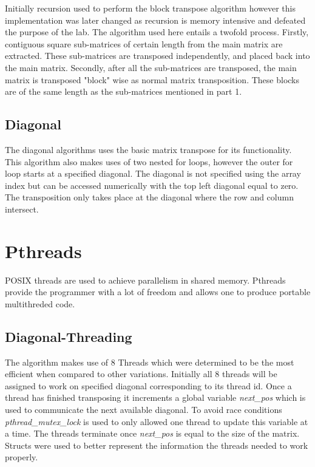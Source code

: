 \documentclass[10pt,journal]{article}
\begin{document}
Initially recursion used to perform the block transpose algorithm however this implementation was later changed as recursion is memory intensive and defeated the purpose of the lab. The algorithm used here entails a twofold process. Firstly, contiguous square sub-matrices of certain length from the main matrix are extracted. These sub-matrices are transposed independently, and placed back into the main matrix. Secondly, after all the sub-matrices are transposed, the main matrix is transposed "block" wise as normal matrix transposition. These blocks are of the same length as the sub-matrices mentioned in part 1. 

\subsection{Diagonal}

The diagonal algorithms uses the basic matrix transpose for its functionality. This algorithm also makes uses of two nested for loops, however the outer for loop starts at a specified diagonal. The diagonal is not specified using the array index but can be accessed numerically with the top left diagonal equal to zero. The transposition only takes place at the diagonal where the row and column intersect. 

\section{Pthreads}

POSIX threads are used to achieve parallelism in shared memory. Pthreads provide the programmer with a lot of freedom and allows one to produce portable multithreded code. 

\subsection{Diagonal-Threading}
The algorithm makes use of 8 Threads which were determined to be the most efficient when compared to other variations. Initially all 8 threads will be assigned to work on specified diagonal corresponding to its thread id. Once a thread has finished transposing it increments a global variable \textit {next\_pos} which is used to communicate the next available diagonal. To avoid race conditions \textit {pthread\_mutex\_lock} is used to only allowed one thread to update this variable at a time. The threads terminate once \textit {next\_pos} is equal to the size of the matrix. Structs were used to better represent the information the threads needed to work properly. 
\end{document}
